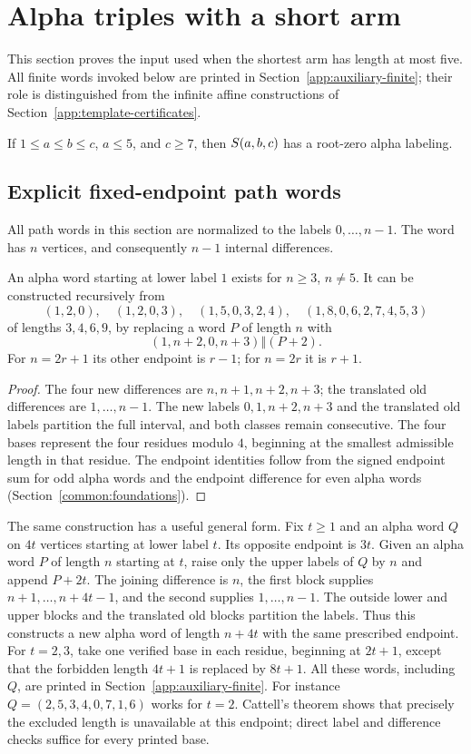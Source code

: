 \section{Alpha triples with a short arm}\label{app:small-alpha}
This section proves the input used when the shortest arm has length at most five. All finite words invoked below are printed in Section~\ref{app:auxiliary-finite}; their role is distinguished from the infinite affine constructions of Section~\ref{app:template-certificates}.

\begin{theorem}\label{sa:main}
If $1\le a\le b\le c$, $a\le5$, and $c\ge7$, then $S\!\left(a,b,c\right)$ has a root-zero alpha labeling.
\end{theorem}

\subsection{Explicit fixed-endpoint path words}
All path words in this section are normalized to the labels $0,\ldots,n-1$. The word has $n$ vertices, and consequently $n-1$ internal differences.
\begin{lemma}\label{sa:endpoint-one}
An alpha word starting at lower label $1$ exists for $n\ge3$, $n\ne5$. It can be constructed recursively from
\[
(1,2,0),\quad(1,2,0,3),\quad(1,5,0,3,2,4),\quad
(1,8,0,6,2,7,4,5,3)
\]
of lengths $3,4,6,9$, by replacing a word $P$ of length $n$ with
\[
(1,n+2,0,n+3)\mathbin\Vert(P+2).
\]
For $n=2r+1$ its other endpoint is $r-1$; for $n=2r$ it is $r+1$.
\end{lemma}
\begin{proof}
The four new differences are $n,n+1,n+2,n+3$; the translated old differences are $1,\ldots,n-1$. The new labels $0,1,n+2,n+3$ and the translated old labels partition the full interval, and both classes remain consecutive. The four bases represent the four residues modulo $4$, beginning at the smallest admissible length in that residue. The endpoint identities follow from the signed endpoint sum for odd alpha words and the endpoint difference for even alpha words (Section~\ref{common:foundations}).
\end{proof}

The same construction has a useful general form. Fix $t\ge1$ and an alpha word $Q$ on $4t$ vertices starting at lower label $t$. Its opposite endpoint is $3t$. Given an alpha word $P$ of length $n$ starting at $t$, raise only the upper labels of $Q$ by $n$ and append $P+2t$. The joining difference is $n$, the first block supplies $n+1,\ldots,n+4t-1$, and the second supplies $1,\ldots,n-1$. The outside lower and upper blocks and the translated old blocks partition the labels. Thus this constructs a new alpha word of length $n+4t$ with the same prescribed endpoint.
For $t=2,3$, take one verified base in each residue, beginning at $2t+1$, except that the forbidden length $4t+1$ is replaced by $8t+1$. All these words, including $Q$, are printed in Section~\ref{app:auxiliary-finite}. For instance $Q=(2,5,3,4,0,7,1,6)$ works for $t=2$. Cattell's theorem shows that precisely the excluded length is unavailable at this endpoint; direct label and difference checks suffice for every printed base.


